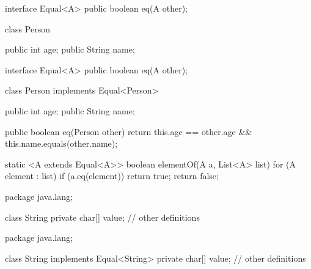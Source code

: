 \documentclass[usenames,dvipsnames,svgnames,table,aspectratio=169,mathserif]{beamer}
\begin{document}
\begin{frame}[fragile]
\begin{javacode}
interface Equal<A> {
  public boolean eq(A other);
}
\end{javacode}

\pause

\begin{javacode}
class Person {
  public int age;
  public String name;




}
\end{javacode}
\end{frame}


\begin{frame}[fragile]
\begin{javacode}
interface Equal<A> {
  public boolean eq(A other);
}
\end{javacode}



\begin{javacode}
class Person implements Equal<Person> {
  public int age;
  public String name;

  public boolean eq(Person other) {
    return this.age == other.age && this.name.equals(other.name);
  }
}
\end{javacode}
\end{frame}


\begin{frame}[fragile]
\begin{javacode}
static <A extends Equal<A>> boolean elementOf(A a, List<A> list) {
  for (A element : list) {
    if (a.eq(element)) return true;
  }
  return false;
}
\end{javacode}

\end{frame}


\begin{frame}[fragile]
\begin{javacode}
package java.lang;

class String {
  private char[] value;
  // other definitions
}
\end{javacode}
\end{frame}


\begin{frame}[fragile]
\begin{javacode}
package java.lang;

class String implements Equal<String> {
  private char[] value;
  // other definitions
}
\end{javacode}
\end{frame}
\end{document}
